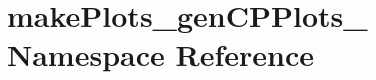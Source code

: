 \hypertarget{namespacemakePlots__genCPPlots__1}{
\section{makePlots\_\-genCPPlots\_ Namespace Reference}
\label{namespacemakePlots__genCPPlots__1}
}
